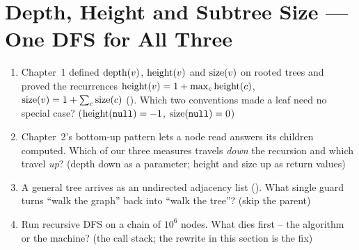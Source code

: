 \section{Depth, Height and Subtree Size --- One DFS for All Three}\label{sec:c09-measures}

\begin{previouslybox}
\begin{enumerate}[nosep, leftmargin=1.6em]
  \item Chapter~1 defined $\operatorname{depth}(v)$, $\operatorname{height}(v)$ and $\operatorname{size}(v)$ on rooted trees and
        proved the recurrences $\operatorname{height}(v)=1+\max_c\operatorname{height}(c)$, $\operatorname{size}(v)=1+\sum_c\operatorname{size}(c)$
        (). Which two conventions made a leaf need no special
        case? ($\operatorname{height}(\texttt{null})=-1$, $\operatorname{size}(\texttt{null})=0$)
  \item Chapter~2's bottom-up pattern lets a node read answers its children computed.
        Which of our three measures travels \emph{down} the recursion and which travel
        \emph{up}? (depth down as a parameter; height and size up as return values)
  \item A general tree arrives as an undirected adjacency list (). What single
        guard turns ``walk the graph'' back into ``walk the tree''? (skip the parent)
  \item Run recursive DFS on a chain of $10^{6}$ nodes. What dies first -- the algorithm
        or the machine? (the call stack; the rewrite in this section is the fix)
\end{enumerate}
\end{previouslybox}

